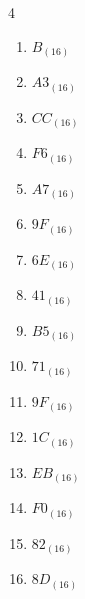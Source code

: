 \begin{multicols}{4}
\begin{enumerate}
  \item $B_{(16)}$

        \phantom{$=11$}

  \item $A3_{(16)}$

        \phantom{$=163$}

  \item $CC_{(16)}$

        \phantom{$=204$}

  \item $F6_{(16)}$

        \phantom{$=246$}

  \item $A7_{(16)}$

        \phantom{$=167$}

  \item $9F_{(16)}$

        \phantom{$=159$}

  \item $6E_{(16)}$

        \phantom{$=110$}

  \item $41_{(16)}$

        \phantom{$=65$}

  \item $B5_{(16)}$

        \phantom{$=181$}

  \item $71_{(16)}$

        \phantom{$=113$}

  \item $9F_{(16)}$

        \phantom{$=159$}

\columnbreak %

  \item $1C_{(16)}$

        \phantom{$=28$}

  \item $EB_{(16)}$

        \phantom{$=235$}

  \item $F0_{(16)}$

        \phantom{$=240$}

  \item $82_{(16)}$

        \phantom{$=130$}

  \item $8D_{(16)}$


\end{enumerate}
\end{multicols}
